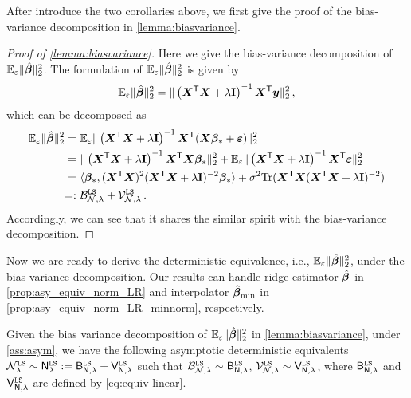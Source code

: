 After introduce the two corollaries above, we first give the proof of the bias-variance decomposition in \cref{lemma:biasvariance}.

\begin{proof}[Proof of \cref{lemma:biasvariance}]
Here we give the bias-variance decomposition of $\mathbb{E}_{\varepsilon}\|\hat{{\boldsymbol \beta}}\|_2^2$. The formulation of $\mathbb{E}_{\varepsilon}\|\hat{{\boldsymbol \beta}}\|_2^2$ is given by
\[
\begin{aligned}
     \mathbb{E}_{\varepsilon}\|\hat{{\boldsymbol \beta}}\|_2^2 =\|\left( {\boldsymbol X}^{\mathsf T} {\boldsymbol X} + \lambda {\mathbf I} \right)^{-1} {\boldsymbol X}^{\mathsf T} {\boldsymbol y} \|_2^2\,,
\end{aligned}
\]
which can be decomposed as
\[
\begin{aligned}
    \mathbb{E}_{\varepsilon}\|\hat{{\boldsymbol \beta}}\|_2^2 =&~ \mathbb{E}_{\varepsilon}\|\left( {\boldsymbol X}^{\mathsf T} {\boldsymbol X} + \lambda {\mathbf I} \right)^{-1} {\boldsymbol X}^{\mathsf T} ({\boldsymbol X}{\boldsymbol \beta}_* + \bm\varepsilon) \|_2^2\\
    =&~ \|\left( {\boldsymbol X}^{\mathsf T} {\boldsymbol X} + \lambda {\mathbf I} \right)^{-1} {\boldsymbol X}^{\mathsf T} {\boldsymbol X}{\boldsymbol \beta}_* \|_2^2 + \mathbb{E}_{\varepsilon}\|\left( {\boldsymbol X}^{\mathsf T} {\boldsymbol X} + \lambda {\mathbf I} \right)^{-1} {\boldsymbol X}^{\mathsf T} \bm\varepsilon \|_2^2\\
    =&~\langle{\boldsymbol \beta}_*, ({\boldsymbol X}^{\mathsf T}{\boldsymbol X})^2({\boldsymbol X}^{\mathsf T}{\boldsymbol X} + \lambda{\mathbf I})^{-2}{\boldsymbol \beta}_*\rangle + \sigma^2{\rm Tr}({\boldsymbol X}^{\mathsf T}{\boldsymbol X}({\boldsymbol X}^{\mathsf T}{\boldsymbol X} + \lambda{\mathbf I})^{-2})\\
    =:&~ \mathcal{B}_{\mathcal{N},\lambda}^{\tt LS} + \mathcal{V}_{\mathcal{N},\lambda}^{\tt LS}\,.
\end{aligned}
\]
Accordingly, we can see that it shares the similar spirit with the bias-variance decomposition.
\end{proof}

Now we are ready to derive the deterministic equivalence, i.e., $\mathbb{E}_{\varepsilon}\|\hat{{\boldsymbol \beta}}\|_2^2$, under the bias-variance decomposition. Our results can handle ridge estimator $\hat{{\boldsymbol \beta}}$ in \cref{prop:asy_equiv_norm_LR} and interpolator $\hat{{\boldsymbol \beta}}_{\min}$ in \cref{prop:asy_equiv_norm_LR_minnorm}, respectively.
\begin{proposition}\label{prop:asy_equiv_norm_LR}
    Given the bias variance decomposition of $\mathbb{E}_{\varepsilon}\|\hat{{\boldsymbol \beta}}\|_2^2$ in \cref{lemma:biasvariance}, 
    under \cref{ass:asym}, we have the following asymptotic deterministic equivalents $\mathcal{N}^{\tt LS}_{\lambda}  \sim \mathsf N^{\tt LS}_{\lambda} := \mathsf B_{\mathsf N,\lambda}^{\tt LS} + \mathsf V_{\mathsf N,\lambda}^{\tt LS}$ such that $\mathcal{B}^{\tt LS}_{\mathcal{N},\lambda} \sim \mathsf B_{\mathsf N,\lambda}^{\tt LS}$, $\mathcal{V}^{\tt LS}_{\mathcal{N},\lambda} \sim \mathsf V_{\mathsf N,\lambda}^{\tt LS}$, where $\mathsf B_{\mathsf N,\lambda}^{\tt LS}$ and $\mathsf V_{\mathsf N,\lambda}^{\tt LS}$ are defined by \cref{eq:equiv-linear}.
\end{proposition}


